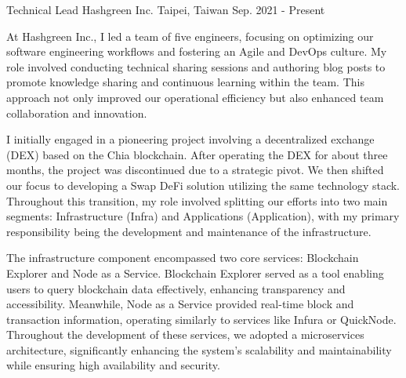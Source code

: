 

\begin{cventries}

\cventry
{Technical Lead} %
{Hashgreen Inc.} %
{Taipei, Taiwan} %
{Sep. 2021 - Present} %
{
  \begin{cvitems} %
    \item {At Hashgreen Inc., I led a team of five engineers, focusing on optimizing our software engineering workflows and fostering an Agile and DevOps culture. My role involved conducting technical sharing sessions and authoring blog posts to promote knowledge sharing and continuous learning within the team. This approach not only improved our operational efficiency but also enhanced team collaboration and innovation.}
    \item {I initially engaged in a pioneering project involving a decentralized exchange (DEX) based on the Chia blockchain. After operating the DEX for about three months, the project was discontinued due to a strategic pivot. We then shifted our focus to developing a Swap DeFi solution utilizing the same technology stack. Throughout this transition, my role involved splitting our efforts into two main segments: Infrastructure (Infra) and Applications (Application), with my primary responsibility being the development and maintenance of the infrastructure.}
    \item {The infrastructure component encompassed two core services: Blockchain Explorer and Node as a Service. Blockchain Explorer served as a tool enabling users to query blockchain data effectively, enhancing transparency and accessibility. Meanwhile, Node as a Service provided real-time block and transaction information, operating similarly to services like Infura or QuickNode. Throughout the development of these services, we adopted a microservices architecture, significantly enhancing the system's scalability and maintainability while ensuring high availability and security.}
  \end{cvitems}
}


\end{cventries}
